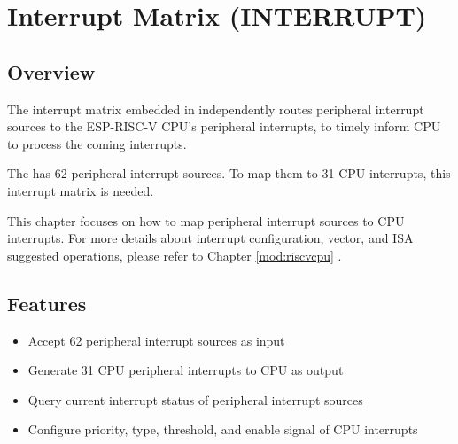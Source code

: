 \documentclass[main\_\_EN.tex]{subfiles}
\begin{document}

\ifglobal
\else
    {\let\clearpage\relax \listoftodos}
    \tableofcontents
\fi



\hypertarget{mod:intmtrx}{}
\chapter{Interrupt Matrix (INTERRUPT)}
\label{mod:intmtrx}

\section{Overview}

The interrupt matrix embedded in \chipname{} independently routes peripheral interrupt sources to the ESP-RISC-V CPU's peripheral interrupts, to timely inform CPU to process the coming interrupts. 

The \chipname{} has 62 peripheral interrupt sources. To map them to 31 CPU interrupts, this interrupt matrix is needed.

\begin{tiplisting}
This chapter focuses on how to map peripheral interrupt sources to CPU interrupts. For more details about interrupt configuration, vector, and ISA suggested operations, please refer to Chapter \ref{mod:riscvcpu} \textit{}.
\end{tiplisting}


\section{Features}

\begin{itemize}
    \item Accept 62 peripheral interrupt sources as input
    \item Generate 31 CPU peripheral interrupts to CPU as output
    \item Query current interrupt status of peripheral interrupt sources
    \item Configure priority, type, threshold, and enable signal of CPU interrupts
\end{itemize}
\end{document}
